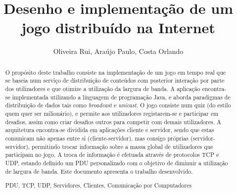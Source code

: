 \documentclass[runningheads,a4paper]{llncs}
\newcommand{\keywords}[1]{\par\addvspace\baselineskip
\noindent\keywordname\enspace\ignorespaces#1}
\begin{document}
\mainmatter  %

\title{Desenho e implementação de um jogo distribuído na Internet}


%
%
\author{Oliveira Rui, Araújo Paulo, Costa Orlando}
%


%
%

\maketitle


\begin{abstract}
O propósito deste trabalho consiste na implementação de um jogo em tempo real que se baseia num serviço de distribuição de conteúdos com posterior interação por parte dos utilizadores e que otimize a utilização da largura de banda. A aplicação encontra-se implementada utilizando a linguagem de programação Java, e aborda paradigmas de distribuição de dados tais como \emph{broadcast} e \emph{unicast}. O jogo consiste num quiz (do estilo quem quer ser milionário), e permite aos utilizadores registarem-se e participar em desafios, assim como criar desafios outros para competir com demais utilizadores. A arquitetura encontra-se dividida em aplicações cliente e servidor, sendo que estas comunicam não apenas entre si (cliente-servidor), mas consigo próprias (servidor-servidor), permitindo trocar informação sobre a massa global de utilizadores que participam no jogo. A troca de informação é efetuada através de protocolos TCP e UDP, estando definido um PDU personalizado com o objetivo de diminuir a utilização de largura de banda. Este documento apresenta o trabalho desenvolvido.
\keywords{PDU, TCP, UDP, Servidores, Clientes, Comunicação por Computadores}
\end{abstract}
\end{document}
